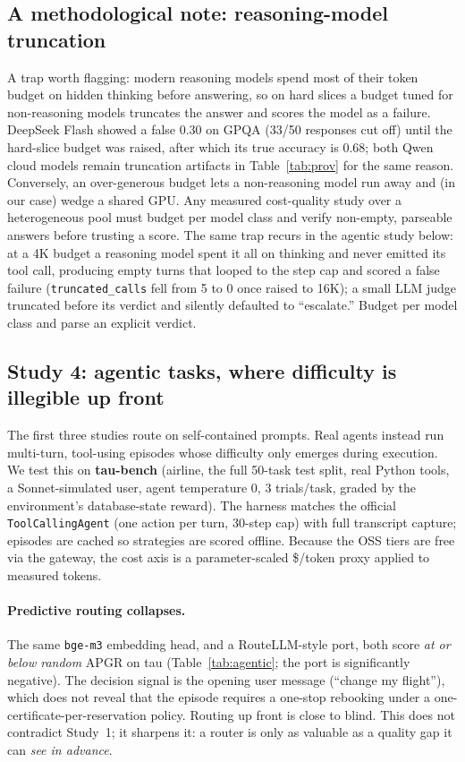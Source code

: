\documentclass[11pt]{article}
\newcommand{\code}[1]{\texttt{\small #1}}
\newcommand{\TAUN}{50}
\begin{document}
\subsection{A methodological note: reasoning-model truncation}
A trap worth flagging: modern reasoning models spend most of their token budget on hidden
thinking before answering, so on hard slices a budget tuned for non-reasoning models
truncates the answer and scores the model as a failure. DeepSeek Flash showed a false 0.30
on GPQA (33/50 responses cut off) until the hard-slice budget was raised, after which its
true accuracy is 0.68; both Qwen cloud models remain truncation artifacts in
Table~\ref{tab:prov} for the same reason. Conversely, an over-generous budget lets a
non-reasoning model run away and (in our case) wedge a shared GPU. Any measured
cost-quality study over a heterogeneous pool must budget per model class and verify
non-empty, parseable answers before trusting a score. The same trap recurs in the agentic
study below: at a 4K budget a reasoning model spent it all on thinking and never emitted its
tool call, producing empty turns that looped to the step cap and scored a false failure
(\code{truncated\_calls} fell from 5 to 0 once raised to 16K); a small LLM judge truncated
before its verdict and silently defaulted to ``escalate.'' Budget per model class and parse an
explicit verdict.

\subsection{Study 4: agentic tasks, where difficulty is illegible up front}
\label{sec:agentic}
The first three studies route on self-contained prompts. Real agents instead run multi-turn,
tool-using episodes whose difficulty only emerges during execution. We test this on
\textbf{tau-bench} (airline, the full \TAUN{}-task test split, real Python tools, a Sonnet-simulated
user, agent temperature 0, 3 trials/task, graded by the environment's database-state reward). The
harness matches the official \code{ToolCallingAgent} (one action per turn, 30-step cap) with full
transcript capture; episodes are cached so strategies are scored offline. Because the OSS tiers are
free via the gateway, the cost axis is a parameter-scaled \$/token proxy applied to measured tokens.

\paragraph{Predictive routing collapses.} The same \code{bge-m3} embedding head, and a
RouteLLM-style port, both score \emph{at or below random} APGR on tau (Table~\ref{tab:agentic}; the
port is significantly negative). The decision signal is the opening user message (``change my
flight''), which does not reveal that the episode requires a one-stop rebooking under a
one-certificate-per-reservation policy. Routing up front is close to blind. This does not contradict
Study~1; it sharpens it: a router is only as valuable as a quality gap it can \emph{see in advance}.
\end{document}
